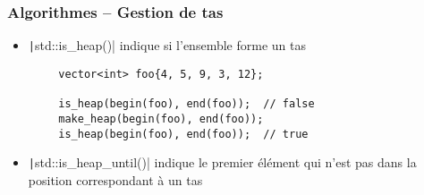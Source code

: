 \documentclass[C++.tex]{subfiles}
\begin{document}
\begin{frame}[fragile]
	\frametitle{Algorithmes -- Gestion de tas}
	\begin{itemize}
		\item \texttt|std::is_heap()| indique si l'ensemble forme un tas
	\end{itemize}

	\begin{verbatim}
		vector<int> foo{4, 5, 9, 3, 12};

		is_heap(begin(foo), end(foo));  // false
		make_heap(begin(foo), end(foo));
		is_heap(begin(foo), end(foo));  // true
	\end{verbatim}

	\begin{itemize}
		\item \texttt|std::is_heap_until()| indique le premier élément qui n'est pas dans la position correspondant à un tas 
	\end{itemize}
\end{frame}
\end{document}
